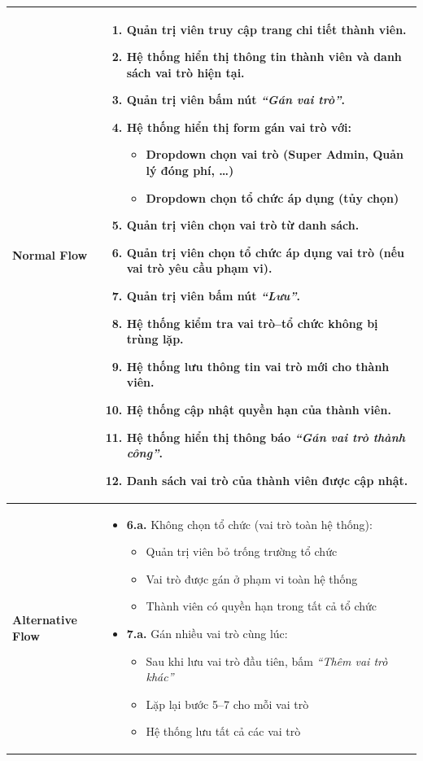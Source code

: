\begin{longtable}{|m{}|m{}|}
\textbf{Normal Flow} 
&
\begin{enumerate}
    \item Quản trị viên truy cập trang chi tiết thành viên.
    \item Hệ thống hiển thị thông tin thành viên và danh sách vai trò hiện tại.
    \item Quản trị viên bấm nút \textit{``Gán vai trò''}.
    \item Hệ thống hiển thị form gán vai trò với:
    \begin{itemize}[label=--]
        \item Dropdown chọn vai trò (Super Admin, Quản lý đóng phí, \ldots)
        \item Dropdown chọn tổ chức áp dụng (tủy chọn)
    \end{itemize}
    \item Quản trị viên chọn vai trò từ danh sách.
    \item Quản trị viên chọn tổ chức áp dụng vai trò (nếu vai trò yêu cầu phạm vi).
    \item Quản trị viên bấm nút \textit{``Lưu''}.
    \item Hệ thống kiểm tra vai trò--tổ chức không bị trùng lặp.
    \item Hệ thống lưu thông tin vai trò mới cho thành viên.
    \item Hệ thống cập nhật quyền hạn của thành viên.
    \item Hệ thống hiển thị thông báo \textit{``Gán vai trò thành công''}.
    \item Danh sách vai trò của thành viên được cập nhật.
\end{enumerate}
\\ 
\hline

\textbf{Alternative Flow} 
&
\begin{itemize}[label=--]
    \item \textbf{6.a.} Không chọn tổ chức (vai trò toàn hệ thống):
    \begin{itemize}[label=+]
        \item Quản trị viên bỏ trống trường tổ chức
        \item Vai trò được gán ở phạm vi toàn hệ thống
        \item Thành viên có quyền hạn trong tất cả tổ chức
    \end{itemize}

    \item \textbf{7.a.} Gán nhiều vai trò cùng lúc:
    \begin{itemize}[label=+]
        \item Sau khi lưu vai trò đầu tiên, bấm \textit{``Thêm vai trò khác''}
        \item Lặp lại bước 5--7 cho mỗi vai trò
        \item Hệ thống lưu tất cả các vai trò
    \end{itemize}


\end{itemize}
\end{longtable}
